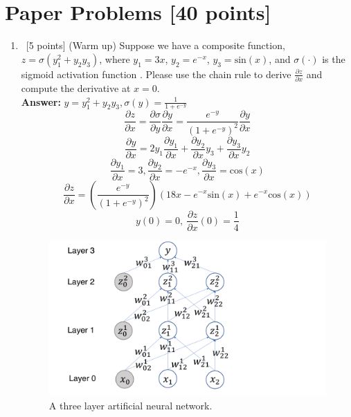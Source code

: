 \documentclass[12pt, fullpage,letterpaper]{article}
\newcommand{\Answer}{{\\\textbf{Answer: }}}
\begin{document}
\section{Paper Problems [40 points]}
\begin{enumerate}
	\item~[5 points] (Warm up) Suppose we have a composite function, $z = \sigma(y_1^2 +y_2y_3) $, where  $y_1 = 3x$, $y_2 = e^{-x}$, $y_3 = \mathrm{sin}(x)$, and $\sigma(\cdot)$ is the sigmoid activation function . Please use the chain rule to derive $\frac{\partial z}{\partial x}$ and  compute the derivative at $x=0$. 
	\Answer $y = y_1^2 + y_2y_3, \sigma(y) = \frac{1}{1+e^{-y}}$
	\[\frac{\partial z}{\partial x} = \frac{\partial \sigma}{\partial y} \frac{\partial y}{\partial x} = \frac{e^{-y}}{(1+e^{-y})^2}\frac{\partial y}{\partial x}\]
	\[\frac{\partial y}{\partial x} = 2y_1\frac{\partial y_1}{\partial x} + \frac{\partial y_2}{\partial x}y_3 + \frac{\partial y_3}{\partial x}y_2\]
	\[\frac{\partial y_1}{\partial x} = 3, \frac{\partial y_2}{\partial x} = -e^{-x}, \frac{\partial y_3}{\partial x} = \mathrm{cos}(x)\]
	\[\frac{\partial z}{\partial x} = \left(\frac{e^{-y}}{(1+e^{-y})^2}\right)\left( 18x - e^{-x}\mathrm{sin}(x) + e^{-x}\mathrm{cos}(x) \right)\]
	\[y(0) = 0, ~ \frac{\partial z}{\partial x}(0) = \frac{1}{4}\]
	\begin{figure}
		\centering
		\includegraphics[width=1.0\textwidth]{./3-layer-NN.pdf}
		\caption{\small A three layer artificial neural network.} 
		\label{fig:3nn}
	\end{figure}
	

\end{enumerate}
\end{document}
